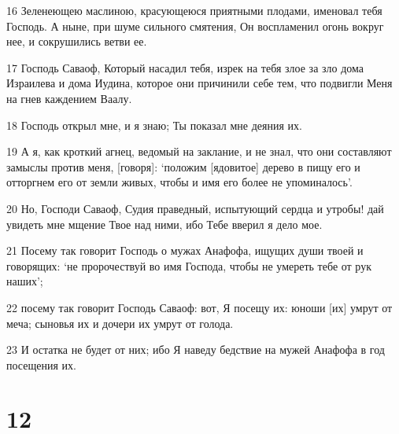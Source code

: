 \par 16 Зеленеющею маслиною, красующеюся приятными плодами, именовал тебя Господь. А ныне, при шуме сильного смятения, Он воспламенил огонь вокруг нее, и сокрушились ветви ее.
\par 17 Господь Саваоф, Который насадил тебя, изрек на тебя злое за зло дома Израилева и дома Иудина, которое они причинили себе тем, что подвигли Меня на гнев каждением Ваалу.
\par 18 Господь открыл мне, и я знаю; Ты показал мне деяния их.
\par 19 А я, как кроткий агнец, ведомый на заклание, и не знал, что они составляют замыслы против меня, [говоря]: `положим [ядовитое] дерево в пищу его и отторгнем его от земли живых, чтобы и имя его более не упоминалось'.
\par 20 Но, Господи Саваоф, Судия праведный, испытующий сердца и утробы! дай увидеть мне мщение Твое над ними, ибо Тебе вверил я дело мое.
\par 21 Посему так говорит Господь о мужах Анафофа, ищущих души твоей и говорящих: `не пророчествуй во имя Господа, чтобы не умереть тебе от рук наших';
\par 22 посему так говорит Господь Саваоф: вот, Я посещу их: юноши [их] умрут от меча; сыновья их и дочери их умрут от голода.
\par 23 И остатка не будет от них; ибо Я наведу бедствие на мужей Анафофа в год посещения их.

\chapter{12}

